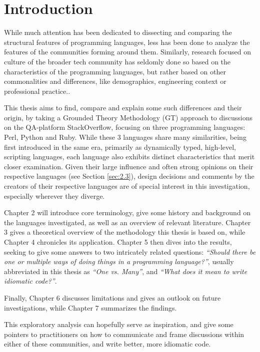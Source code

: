 \section{Introduction}

While much attention has been dedicated to dissecting and comparing the structural features of programming languages,
less has been done to analyze the features of the communities forming around them. Similarly, research focused on culture
of the broader tech community has seldomly done so based on the characteristics of the programming languages, but rather
based on other commonalities and differences, like demographics,
engineering context or professional practice.\cite{lenberg_behavioral_2015}.

This thesis aims to find, compare and explain some such differences and their origin, by taking a Grounded Theory Methodology (GT)
approach to discussions on the QA-platform StackOverflow, focusing on three programming languages: Perl, Python and Ruby.
While these 3 languages share many similarities, being first introduced in the same era, primarily as dynamically typed,
high-level, scripting languages, each language also exhibits distinct characteristics that merit closer examination.
Given their large influence and often strong opinions on their respective languages (see Section \ref{sec:2.3}), design decisions
and comments by the creators of their respective languages are of special interest in this investigation,
especially wherever they diverge.

Chapter 2 will introduce core terminology, give some history and background on the languages investigated,
as well as an overview of relevant literature. Chapter 3 gives a theoretical overview of the methodology this thesis is
based on, while Chapter 4 chronicles its application. Chapter 5 then dives into the results, seeking to give some answers
to two intricately related questions: \textit{“Should there be one or multiple ways of doing things in a programming language?”},
usually abbreviated in this thesis as \textit{“One vs. Many”}, and \textit{“What does it mean to write idiomatic code?”}.

Finally, Chapter 6 discusses limitations and gives an outlook on future investigations, while Chapter 7 summarizes the findings.

This exploratory analysis can hopefully serve as inspiration, and give some pointers to practitioners on how to communicate and
frame discussions within either of these communities, and write better, more idiomatic code.
